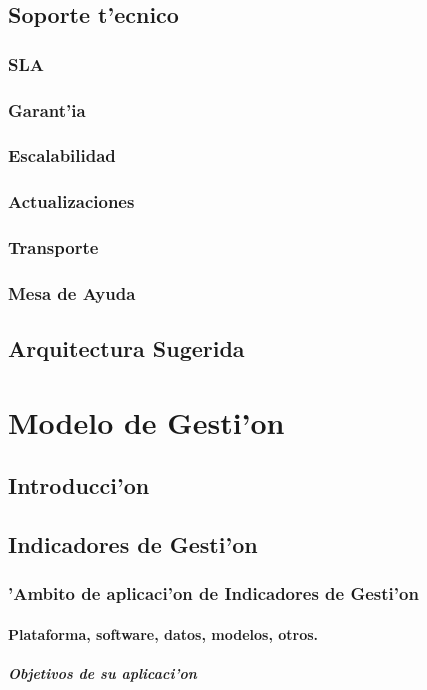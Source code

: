 \documentclass[letterpaper,openright,10pt,oneside]{report}
\begin{document}
	\chapter{Soporte t'ecnico}
		\section{SLA}
		\section{Garant'ia}
		\section{Escalabilidad}
		\section{Actualizaciones}
		\section{Transporte}
		\section{Mesa de Ayuda}
	\chapter{Arquitectura Sugerida}
\part{Modelo de Gesti'on}
	\chapter{Introducci'on}
	\chapter{Indicadores de Gesti'on}
		\section{'Ambito de aplicaci'on de Indicadores de Gesti'on}
			\subsection{Plataforma, software, datos, modelos, otros.}
				\subsubsection{Objetivos de su aplicaci'on}
\end{document}
